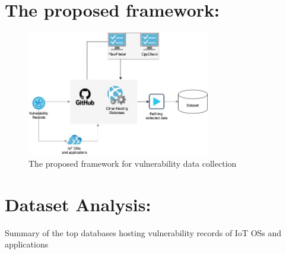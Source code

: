 \documentclass[sigconf,screen,balance,natbib=false,timestamp=false,urlbreakonhyphens=true]{acmart}
\begin{document}
\section{The proposed framework:}

\begin{figure}[h!]
  \centering
  \includegraphics[width=8cm]{../figure/framework.jpg}
  \vspace*{-1.5ex}
  \caption{The proposed framework for vulnerability data collection}
  \label{fig:lcurve-iot}
\end{figure}


\section{Dataset Analysis:}

\begin{table}[!t]
  \centering
  {\csvlinetotablerow}
  \caption{Summary of the top databases hosting vulnerability records of IoT OSs and applications}
  \label{tab:software}
  \end{table}
\end{document}
